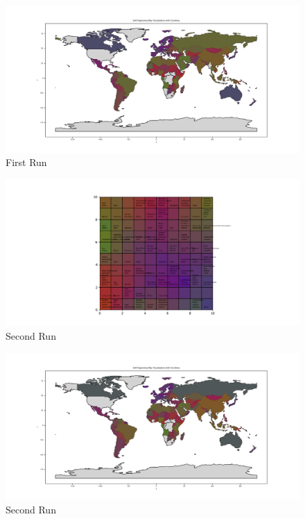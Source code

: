 \documentclass{article}
\begin{document}
\begin{figure}[H]
  \centering
  \includegraphics[width=1\linewidth]{images/som_map1.png}
  \caption{First Run}
\end{figure}

\begin{figure}[H]
  \centering
  \includegraphics[width=1\linewidth]{images/som_grid2.png}
  \caption{Second Run}
\end{figure}

\begin{figure}[H]
  \centering
  \includegraphics[width=1\linewidth]{images/som_map2.png}
  \caption{Second Run}
\end{figure}
\end{document}
